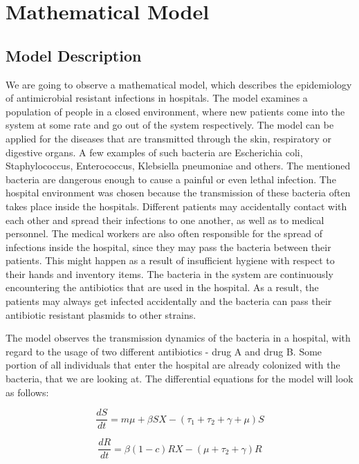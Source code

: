 \chapter{Mathematical Model}


\section{Model Description}

We are going to observe a mathematical model, which describes the epidemiology of antimicrobial resistant infections in hospitals. The model examines a population of people in a closed environment, where new patients come into the system at some rate and go out of the system respectively. The model can be applied for the diseases that are transmitted through the skin, respiratory or digestive organs. A few examples of such bacteria are Escherichia coli, Staphylococcus, Enterococcus, Klebsiella pneumoniae and others. The mentioned bacteria are dangerous enough to cause a painful or even lethal infection. The hospital environment was chosen because the transmission of these bacteria often takes place inside the hospitals. Different patients may accidentally contact with each other and spread their infections to one another, as well as to medical personnel. The medical workers are also often responsible for the spread of infections inside the hospital, since they may pass the bacteria between their patients. This might happen as a result of insufficient hygiene with respect to their hands and inventory items. The bacteria in the system are continuously encountering the antibiotics that are used in the hospital. As a result, the patients may always get infected accidentally and the bacteria can pass their antibiotic resistant plasmids to other strains.

The model observes the transmission dynamics of the bacteria in a hospital, with regard to the usage of two different antibiotics - drug A and drug B. Some portion of all individuals that enter the hospital are already colonized with the bacteria, that we are looking at. The differential equations for the model will look as follows:

\begin{equation}
\frac{dS}{dt} = m \mu + \beta S X - (\tau_1 + \tau_2 + \gamma + \mu) S
\end{equation}

\begin{equation}
\frac{dR}{dt} = \beta (1 - c) R X - (\mu + \tau_2 + \gamma) R
\end{equation}


